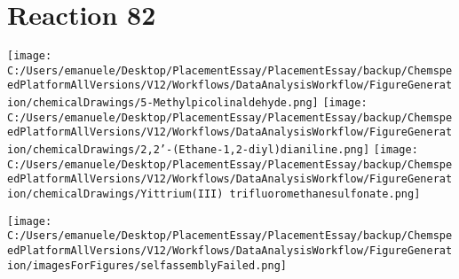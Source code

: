 \documentclass{article}%
\begin{document}
\section*{Reaction 82}%
%
\begin{scheme}[H]%
\begin{minipage}{0.5\textwidth}%
\texttt{[image: C:/Users/emanuele/Desktop/PlacementEssay/PlacementEssay/backup/ChemspeedPlatformAllVersions/V12/Workflows/DataAnalysisWorkflow/FigureGeneration/chemicalDrawings/5-Methylpicolinaldehyde.png]}%
\texttt{[image: C:/Users/emanuele/Desktop/PlacementEssay/PlacementEssay/backup/ChemspeedPlatformAllVersions/V12/Workflows/DataAnalysisWorkflow/FigureGeneration/chemicalDrawings/2,2'-(Ethane-1,2-diyl)dianiline.png]}%
\texttt{[image: C:/Users/emanuele/Desktop/PlacementEssay/PlacementEssay/backup/ChemspeedPlatformAllVersions/V12/Workflows/DataAnalysisWorkflow/FigureGeneration/chemicalDrawings/Yittrium(III) trifluoromethanesulfonate.png]}%
\end{minipage}%
\begin{minipage}{0.5\textwidth}%
\begin{center}%
\texttt{[image: C:/Users/emanuele/Desktop/PlacementEssay/PlacementEssay/backup/ChemspeedPlatformAllVersions/V12/Workflows/DataAnalysisWorkflow/FigureGeneration/imagesForFigures/selfassemblyFailed.png]}%
\end{center}%
\end{minipage}%
\caption{Self-assembly of components 3, 20, with Yittrium(III) in a 3.0:1.5:1.0 molar ratio in CH$_3$CN at 60\textdegree C for 40h. These are the reagents (starting materials) for reaction 82.}%
\end{scheme}%
\end{document}
